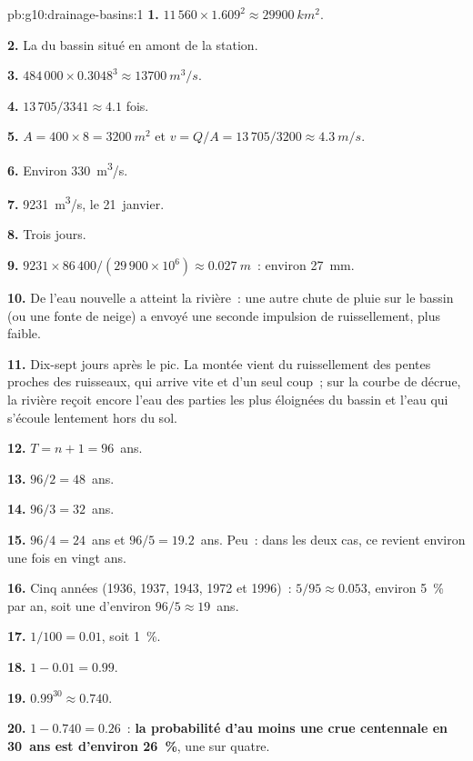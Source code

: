 \begin{solution}{pb:g10:drainage-basins:1}
\textbf{1.} $11\,560 \times 1.609^2 \approx \qty{29900}{km^2}$.

\textbf{2.} La  du bassin situé en amont de la
station.

\textbf{3.} $484\,000 \times 0.3048^3 \approx \qty{13700}{m^3/s}$.

\textbf{4.} $13\,705/3341 \approx 4.1$ fois.

\textbf{5.} $A = 400 \times 8 = \qty{3200}{m^2}$ et $v = Q/A = 13\,705/3200
\approx \qty{4.3}{m/s}$.

\textbf{6.} Environ \qty{330}{m^3/s}.

\textbf{7.} \qty{9231}{m^3/s}, le 21~janvier.

\textbf{8.} Trois jours.

\textbf{9.} $9231 \times 86\,400/(29\,900 \times 10^6) \approx
\qty{0.027}{m}$~: environ \qty{27}{mm}.

\textbf{10.} De l'eau nouvelle a atteint la rivière~: une autre chute de
pluie sur le bassin (ou une fonte de neige) a envoyé une seconde impulsion
de ruissellement, plus faible.

\textbf{11.} Dix-sept jours après le pic. La montée vient du ruissellement
des pentes proches des ruisseaux, qui arrive vite et d'un seul coup~; sur la
courbe de décrue, la rivière reçoit encore l'eau des parties les plus
éloignées du bassin et l'eau qui s'écoule lentement hors du sol.

\textbf{12.} $T = n + 1 = 96$~ans.

\textbf{13.} $96/2 = 48$~ans.

\textbf{14.} $96/3 = 32$~ans.

\textbf{15.} $96/4 = 24$~ans et $96/5 = 19.2$~ans. Peu~: dans les deux cas,
ce  revient environ une fois en vingt ans.

\textbf{16.} Cinq années (1936, 1937, 1943, 1972 et 1996)~: $5/95 \approx
0.053$, environ \qty{5}{\percent} par an, soit une 
d'environ $96/5 \approx 19$~ans.

\textbf{17.} $1/100 = 0.01$, soit \qty{1}{\percent}.

\textbf{18.} $1 - 0.01 = 0.99$.

\textbf{19.} $0.99^{30} \approx 0.740$.

\textbf{20.} $1 - 0.740 = 0.26$~: \textbf{la probabilité d'au moins une crue
centennale en 30~ans est d'environ \qty{26}{\percent}}, une sur quatre.
\end{solution}
